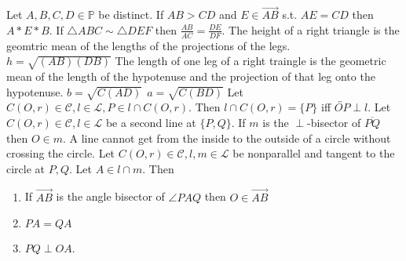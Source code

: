 \documentclass[12pt]{article}
\theoremstyle{lowspace}
\newenvironment{customthm}[1]
  {\renewcommand\theinnercustomthm{#1}\innercustomthm}
  {\endinnercustomthm}
\theoremstyle{lowspace}
\theoremstyle{lowspace}
\newenvironment{customlemma}[1]
  {\renewcommand\theinnercustomlemma{#1}\innercustomlemma}
  {\endinnercustomlemma}
\begin{document}
    \begin{customlemma}{5.3.0}
      Let $A,B,C,D \in \mathbb{P}$ be distinct. If $AB >CD$ and $E \in \overrightarrow{AB}$ s.t. $AE = CD$ then $A*E*B$.
    \end{customlemma}
    \begin{customthm}{5.3.1 (Fundamental Theorem of Similar Triangles)}
      If $\triangle ABC \sim \triangle DEF$ then $\frac{AB}{AC} = \frac{DE}{DF}$.
    \end{customthm}
    \begin{customthm}{5.4.3}
      The height of a right triangle is the geomtric mean of the lengths of the projections of the legs. \\
      $h = \sqrt{(AB)(DB)}$
    \end{customthm}
    \begin{customthm}{5.4.4}
      The length of one leg of a right traingle is the geometric mean of the length of the hypotenuse and the projection of that leg onto the hypotenuse.
      $b = \sqrt{C(AD)} \ \ a = \sqrt{C(BD)}$
    \end{customthm}
    \begin{customthm}{8.1.7 (Tangent Line Theorem)}
      Let $C(O,r) \in \mathscr{C}, l\in \mathscr{L}, P \in l \cap C(O,r)$. Then $l \cap C(O, r) = \{P\}$ iff $\overleftrightarrow{OP} \perp l$.
    \end{customthm}
    \begin{customthm}{8.1.9 (Secant Line Theorem)}
      Let $C(O,r) \in \mathscr{C}, l \in \mathscr{L}$ be a second line at $\{P, Q\}$. If $m$ is the $\perp$-bisector of $\overline{PQ}$ then $O \in m$.
    \end{customthm}
    \begin{customthm}{8.1.11 (Elementary Circular Continuity)}
      A line cannot get from the inside to the outside of a circle without crossing the circle.
    \end{customthm}
    \newpage
    \begin{customthm}{8.1.16}
      Let $C(O,r) \in \mathscr{C}, l,m \in \mathscr{L}$ be nonparallel and tangent to the circle at $P,Q$. Let $A \in l \cap m$. Then
      \begin{enumerate}
        \item If $\overrightarrow{AB}$ is the angle bisector of $\angle PAQ$ then $O \in \overrightarrow{AB}$
        \item $PA = QA$
        \item $PQ \perp OA$.
      \end{enumerate}
    \end{customthm}
\end{document}

